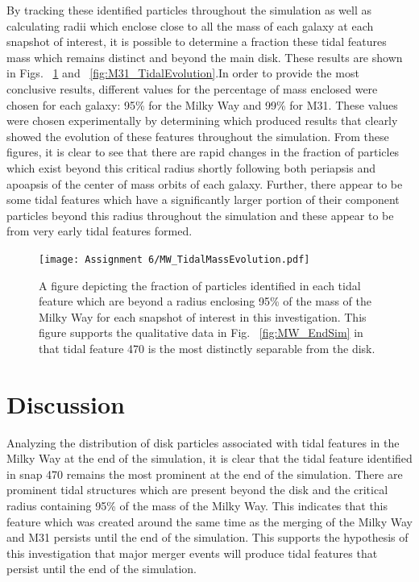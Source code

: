 \documentclass[fleqn,usenatbib]{mnras}
\begin{document}
By tracking these identified particles throughout the simulation as well as calculating radii which enclose close to all the mass of each galaxy at each snapshot of interest, it is possible to determine a fraction these tidal features mass which remains distinct and beyond the main disk. These results are shown in Figs. ~\ref{fig:MW_TidalEvolution} and ~\ref{fig:M31_TidalEvolution}.In order to provide the most conclusive results, different values for the percentage of mass enclosed were chosen for each galaxy: 95\% for the Milky Way and 99\% for M31. These values were chosen experimentally by determining which produced results that clearly showed the evolution of these features throughout the simulation. From these figures, it is clear to see that there are rapid changes in the fraction of particles which exist beyond this critical radius shortly following both periapsis and apoapsis of the center of mass orbits of each galaxy. Further, there appear to be some tidal features which have a significantly larger portion of their component particles beyond this radius throughout the simulation and these appear to be from very early tidal features formed. 

\begin{figure}
	\texttt{[image: Assignment 6/MW\_TidalMassEvolution.pdf]}
    \caption{A figure depicting the fraction of particles identified in each tidal feature which are beyond a radius enclosing 95\% of the mass of the Milky Way for each snapshot of interest in this investigation. This figure supports the qualitative data in Fig. ~\ref{fig:MW_EndSim} in that tidal feature 470 is the most distinctly separable from the disk.}
    \label{fig:MW_TidalEvolution}
\end{figure}

\section{Discussion}
Analyzing the distribution of disk particles associated with tidal features in the Milky Way at the end of the simulation, it is clear that the tidal feature identified in snap 470 remains the most prominent at the end of the simulation. There are prominent tidal structures which are present beyond the disk and the critical radius containing 95\% of the mass of the Milky Way. This indicates that this feature which was created around the same time as the merging of the Milky Way and M31 persists until the end of the simulation. This supports the hypothesis of this investigation that major merger events will produce tidal features that persist until the end of the simulation. 
\end{document}
